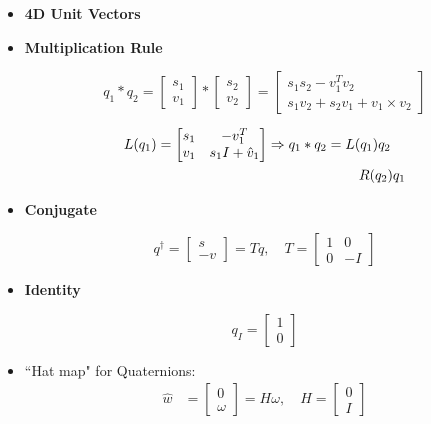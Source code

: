\documentclass[11pt]{article}
\begin{document}
\begin{itemize}
    \item \textbf{4D Unit Vectors}
    \item \textbf{Multiplication Rule}
    
    \begin{equation*}
        q_1 * q_2 = 
        \begin{bmatrix} s_1 \\ v_1 \end{bmatrix} *
        \begin{bmatrix} s_2 \\ v_2 \end{bmatrix} =
        \begin{bmatrix} 
            s_1 s_2 - v_1^T v_2 \\
            s_1 v_2 + s_2 v_1 + v_1 \times v_2
        \end{bmatrix}
    \end{equation*}

    
    \begin{align*}
        L(q_1) &= 
        \begin{bmatrix}
            s_1  & -v_1^T \\
            v_1  & s_1 I + \hat{v}_1
        \end{bmatrix}
        \Rightarrow q_1 * q_2 = L(q_1) q_2
        \\& \hspace{51mm} R(q_2) q_1
    \end{align*}


    \item \textbf{Conjugate}
    
    \begin{equation*}
        q^\dagger = \begin{bmatrix} s \\ -v \end{bmatrix} = T q
   ,\quad
        T = \begin{bmatrix} 1 & 0 \\ 0 & -I \end{bmatrix}
    \end{equation*}

    \item \textbf{Identity}
    
    \begin{equation*}
        q_I = \begin{bmatrix} 1 \\ 0 \end{bmatrix}
    \end{equation*}
    \item ``Hat map" for Quaternions:
    \begin{align*}
        \hat{w} &= \begin{bmatrix}
            0 \\
            \omega
        \end{bmatrix}
        = 
        H\omega, \quad H = \begin{bmatrix}
            0 \\
            I
        \end{bmatrix}
    \end{align*}
\end{itemize}
\end{document}
